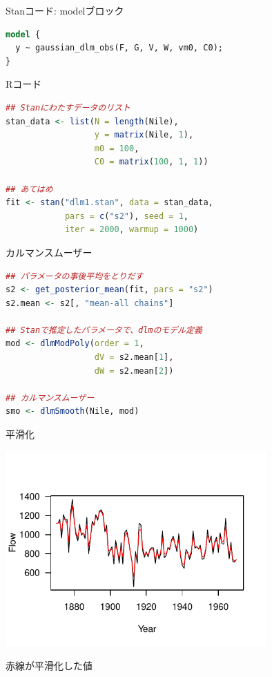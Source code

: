 \documentclass[dvipdfmx,12pt]{beamer}
\begin{document}
\begin{frame}[fragile]{Stanコード: modelブロック}

\begin{lstlisting}[language=Stan]
model {
  y ~ gaussian_dlm_obs(F, G, V, W, vm0, C0);
}
\end{lstlisting}
\end{frame}

\begin{frame}[fragile]{Rコード}

\begin{lstlisting}[language=R]
## Stanにわたすデータのリスト
stan_data <- list(N = length(Nile),
                  y = matrix(Nile, 1),
                  m0 = 100,
                  C0 = matrix(100, 1, 1))

## あてはめ
fit <- stan("dlm1.stan", data = stan_data,
            pars = c("s2"), seed = 1,
            iter = 2000, warmup = 1000)
\end{lstlisting}
\end{frame}

\begin{frame}[fragile]{カルマンスムーザー}

\begin{lstlisting}[language=R]
## パラメータの事後平均をとりだす
s2 <- get_posterior_mean(fit, pars = "s2")
s2.mean <- s2[, "mean-all chains"]

## Stanで推定したパラメータで、dlmのモデル定義
mod <- dlmModPoly(order = 1,
                  dV = s2.mean[1],
                  dW = s2.mean[2])

## カルマンスムーザー
smo <- dlmSmooth(Nile, mod)
\end{lstlisting}
\end{frame}

\begin{frame}{平滑化}

\begin{center}
\includegraphics[width=10cm]{dlm1_smooth}
\end{center}

赤線が平滑化した値
\end{frame}
\end{document}
